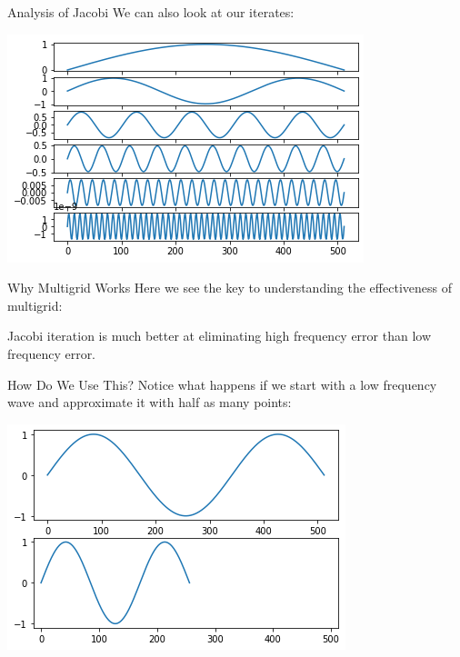 \documentclass[11pt]{beamer}
\begin{document}
\begin{frame}{Analysis of Jacobi}
  We can also look at our iterates:
  \begin{center}
    \includegraphics[width=\linewidth]{output_14_0.png}
  \end{center}
\end{frame}
\begin{frame}{Why Multigrid Works}
  Here we see the key to understanding the effectiveness of multigrid:

  Jacobi iteration is much better at eliminating high frequency error than low frequency error.
\end{frame}
\begin{frame}{How Do We Use This?}
  Notice what happens if we start with a low frequency wave and approximate it
  with half as many points:
  \begin{center}
    \includegraphics[width=\linewidth]{output_18_0.png}
  \end{center}
\end{frame}
\end{document}
